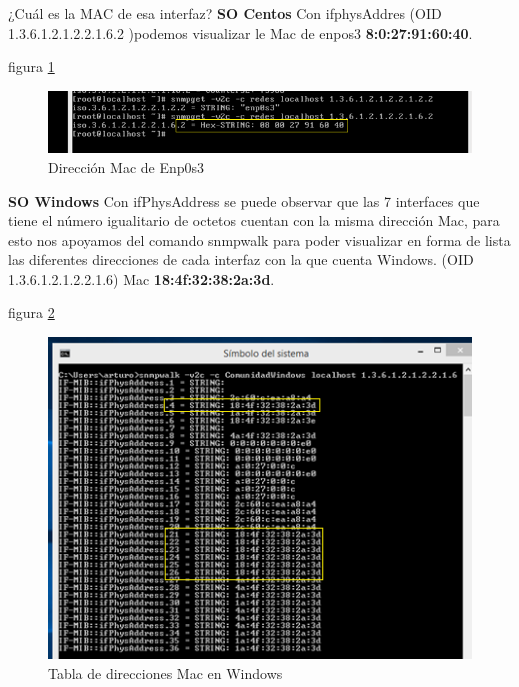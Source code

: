 \item ¿Cuál es la MAC de esa interfaz?
\textbf{SO Centos}
Con ifphysAddres (OID 1.3.6.1.2.1.2.2.1.6.2 )podemos visualizar le Mac de enpos3 \textbf{8:0:27:91:60:40}.

figura  \ref{image:Pregunta6C}
 \FloatBarrier
\begin{figure}[htbp!]
		\centering
		    \includegraphics[width=.9 \textwidth]{../images/Pregunta6C.png} 
		\caption{Dirección Mac de Enp0s3}
		\label{image:Pregunta6C}
\end{figure}
\FloatBarrier

\textbf{SO Windows}
Con ifPhysAddress se puede observar que las 7 interfaces que tiene el número igualitario de octetos cuentan con la misma dirección Mac, para esto nos apoyamos del comando snmpwalk para poder visualizar en forma de lista las diferentes direcciones de cada interfaz con la que cuenta Windows. (OID 1.3.6.1.2.1.2.2.1.6)
Mac \textbf{18:4f:32:38:2a:3d}.

figura  \ref{image:Pregunta6W}
 \FloatBarrier
\begin{figure}[htbp!]
		\centering
		    \includegraphics[width=.8 \textwidth]{../images/Pregunta6W.png} 
		\caption{Tabla de direcciones Mac en Windows}
		\label{image:Pregunta6W}
\end{figure}
\FloatBarrier